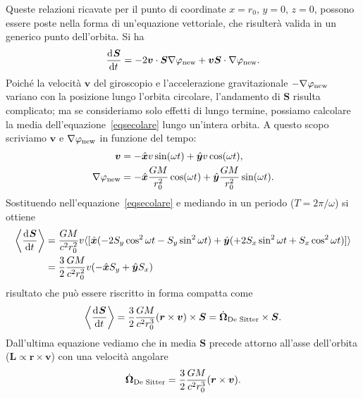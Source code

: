 Queste relazioni ricavate per il punto di coordinate $x=r_0$, $y=0$, $z=0$,
possono essere poste nella forma di un'equazione vettoriale, che risulterà
valida in un generico punto dell'orbita.  Si ha
\begin{equation}
  \label{eqsecolare}
  \toder{\bm{S}}{t} = -2 \bm{v} \cdot \bm{S} \nabla \phi_{\textup{new}} +
  \bm{v}\bm{S} \cdot \nabla\phi_{\textup{new}}.
\end{equation}
Poiché la velocità $\bm{v}$ del giroscopio e l'accelerazione gravitazionale
$-\nabla \phi_{\textup{new}}$ variano con la posizione lungo l'orbita circolare,
l'andamento di $\bm S$ risulta complicato; ma se consideriamo solo effetti di
lungo termine, possiamo calcolare la media dell'equazione~\eqref{eqsecolare}
lungo un'intera orbita.  A questo scopo scriviamo $\bm{v}$ e
$\nabla\phi_{\textup{new}}$ in funzione del tempo:
\begin{subequations}
  \begin{align}
    \bm{v} &= -\versor{x} v \sin(\omega t) + \versor{y} v \cos(\omega t), \\
    \nabla\phi_{\textup{new}} &= -\versor{x} \frac{GM}{r_0^2} \cos(\omega t)
                                + \versor{y}\frac{GM}{r_0^2} \sin(\omega t).
  \end{align}
\end{subequations}
Sostituendo nell'equazione~\eqref{eqsecolare} e mediando in un periodo ($T=2
\pi/ \omega$) si ottiene
\begin{equation}
  \begin{split}
    \left\langle\toder{\bm{S}}{t}\right\rangle &= \frac{GM}{c^2 r_0^2} v
    \langle [\versor{x} (-2 S_y \cos^2 \omega t - S_y \sin^2\omega t) +
    \versor{y} ( +2 S_x \sin^2 \omega t + S_x \cos^2 \omega t) ]\rangle \\
    &= \frac{3}{2} \frac{GM}{c^2 r_0^2} v (-\versor{x} S_y + \versor{y} S_x)
  \end{split}
\end{equation}
risultato che può essere riscritto in forma compatta come
\begin{equation}
  \left\langle\toder{\bm{S}}{t}\right\rangle = \frac{3}{2}
  \frac{GM}{c^2 r_0^3} (\bm{r} \times \bm{v}) \times \bm{S} =
  \dot{\bm{\Omega}}_{\textup{De Sitter}} \times \bm{S}.
\end{equation}
Dall'ultima equazione vediamo che in media $\bm{S}$ precede attorno all'asse
dell'orbita ($\bm{L} \propto \bm{r} \times \bm{v}$) con una velocità angolare
\begin{equation}
  \dot{\bm{\Omega}}_{\textup{De Sitter}} = \frac{3}{2} \frac{GM}{c^2 r_0^3}
  (\bm{r} \times \bm{v}).
\end{equation}


